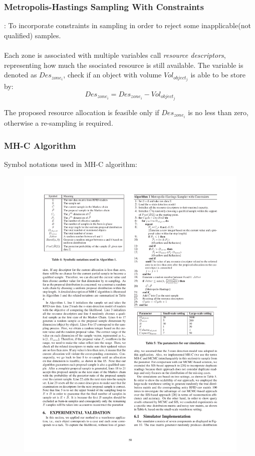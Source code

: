 
\begin{frame}
\frametitle{Metropolis-Hastings Sampling With Constraints}

: To incorporate constraints in sampling in order to reject some inapplicable(not qualified) samples.\\~\\

Each zone is associated with multiple variables call \emph{resource descriptors}, representing how much the ssociated resource is still available. The variable is denoted as $Des_{zone_i}$, check if an object with volume $Vol_{object_j}$ is able to be store by:
\begin{equation}
  Des_{zone_i} = Des_{zone_i} - Vol_{object_j}
\end{equation}

The proposed resource allocation is feasible only if $Des_{zone_i}$ is no less than zero, otherwise a re-sampling is required.

\end{frame}


\begin{frame}
\frametitle{MH-C Algorithm}

Symbol notations used in MH-C algorithm:

\begin{figure}[tb]
  \includegraphics[width=0.7\columnwidth]{figures/3-1/3-1-11.pdf}
\end{figure}

\end{frame}

